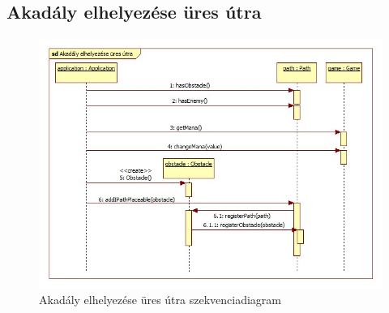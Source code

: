 \subsection{Akadály elhelyezése üres útra}
\begin{figure}[H]
\begin{center}
\includegraphics[width=17cm]{chapters/chapter05/images/sd_Akadaly_elhelyezese_ures_utra.jpg}
\caption{Akadály elhelyezése üres útra szekvenciadiagram}
\label{fig:sd_Akadaly_elhelyezese_ures_utra}
\end{center}
\end{figure}

